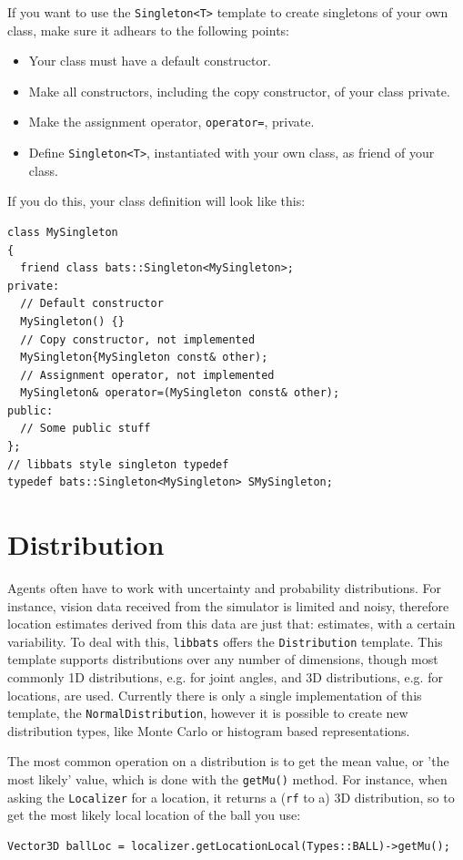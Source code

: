 If you want to use the {\tt Singleton<T>} template to create
singletons of your own class, make sure it adhears to the following
points:
\begin{itemize}
\item Your class must have a default constructor.
\item Make all constructors, including the copy constructor, of your
  class private.
\item Make the assignment operator, {\tt operator=}, private.
\item Define {\tt Singleton<T>}, instantiated with your own class, as
  friend of your class.
\end{itemize}
If you do this, your class definition will look like this:
\begin{lstlisting}[frame=single]
class MySingleton
{
  friend class bats::Singleton<MySingleton>;
private:
  // Default constructor
  MySingleton() {}
  // Copy constructor, not implemented
  MySingleton{MySingleton const& other);
  // Assignment operator, not implemented
  MySingleton& operator=(MySingleton const& other);
public:
  // Some public stuff
};
// libbats style singleton typedef
typedef bats::Singleton<MySingleton> SMySingleton;
\end{lstlisting}

\section{Distribution}

Agents often have to work with uncertainty and probability
distributions. For instance, vision data received from the simulator
is limited and noisy, therefore location estimates derived from this
data are just that: estimates, with a certain variability. To deal
with this, {\tt libbats} offers the {\tt Distribution} template. This
template supports distributions over any number of dimensions, though
most commonly 1D distributions, e.g. for joint angles, and 3D
distributions, e.g. for locations, are used. Currently there is only a
single implementation of this template, the {\tt NormalDistribution},
however it is possible to create new distribution types, like Monte
Carlo or histogram based representations.

The most common operation on a distribution is to get the mean value,
or 'the most likely' value, which is done with the {\tt getMu()}
method. For instance, when asking the {\tt Localizer} for a location,
it returns a ({\tt rf} to a) 3D distribution, so to get the most
likely local location of the ball you use:
\begin{lstlisting}[frame=single]
Vector3D ballLoc = localizer.getLocationLocal(Types::BALL)->getMu();
\end{lstlisting}

